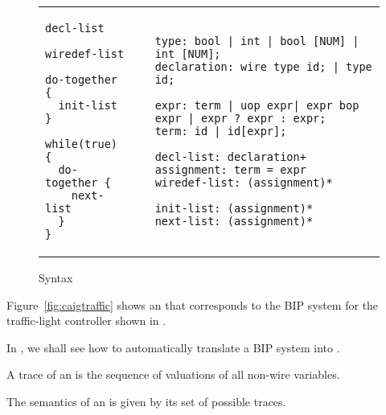 \begin{figure*}
\begin{tabular}{p{3cm}p{0.5cm}p{10cm}}
\begin{lstlisting}
decl-list

wiredef-list

do-together {
  init-list 
}

while(true) {
  do-together {
    next-list
  } 
}
\end{lstlisting}
&
&
\begin{lstlisting}
type: bool | int | bool [NUM] | int [NUM]; 
declaration: wire type id; | type id;

expr: term | uop expr| expr bop expr | expr ? expr : expr;
term: id | id[expr]; 

decl-list: declaration+
assignment: term = expr
wiredef-list: (assignment)*

init-list: (assignment)* 
next-list: (assignment)* 
\end{lstlisting}
\end{tabular}
\caption{\caig Syntax}
\label{fig:gr}
\end{figure*}
%
\begin{example}
Figure~\ref{fig:caigtraffic} shows an \caig that corresponds to the BIP system for the traffic-light controller shown in . 

\end{example}
%
In , we shall see how to automatically translate a BIP system into \caig.
%
%
%
\begin{definition}
A trace of an \caig is the sequence of valuations of all non-wire variables.
\end{definition}
%
The semantics of an \caig is given by its set of possible traces.  
%
